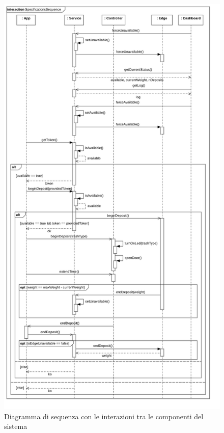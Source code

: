 \documentclass[a4paper, 12pt]{report}
\begin{document}
	\begin{figure}[H]
		\centering
		\includegraphics[height=0.93\textheight]{"img/Sequence"}    
		\caption{Diagramma di sequenza con le interazioni tra le componenti del sistema}
	\end{figure}
\end{document}
